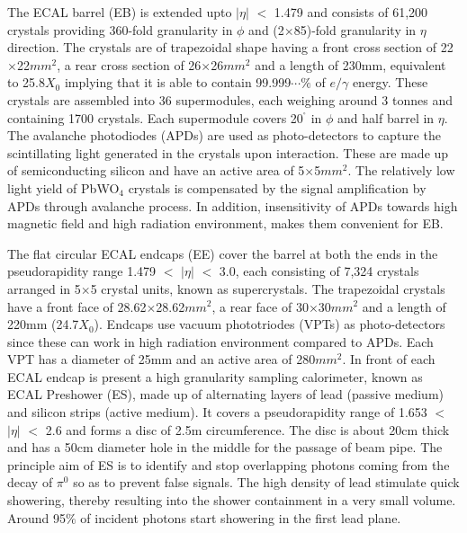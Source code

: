 The ECAL barrel (EB) is extended upto $|\eta|$ $<$ 1.479 and consists of 61,200 crystals providing 360-fold granularity in $\phi$ and (2$\times$85)-fold
granularity in $\eta$ direction. The crystals are of trapezoidal shape having a front cross section of 22$\times$22$\unit{mm}^{2}$,
a rear cross section of 26$\times$26$\unit{mm}^{2}$ and
a length of 230\unit{mm}, equivalent to 25.8$X_{0}$ implying that it is able to contain 99.999$\cdots\%$ of $e/\gamma$ energy. These crystals are assembled
into 36 supermodules, each weighing around 3 tonnes and containing 1700 crystals. Each supermodule covers 20$^{^{\circ}}$ in $\phi$ and half barrel in $\eta$.
The avalanche photodiodes (APDs) are used as photo-detectors to capture the scintillating light generated in the crystals upon interaction. These are made up of
semiconducting silicon and have an active area of 5$\times$5$\unit{mm}^{2}$. The relatively low light yield of PbWO$_{4}$ crystals is compensated by the
signal amplification by APDs through avalanche process. In addition, insensitivity of APDs towards high magnetic field and high radiation environment, makes them
convenient for EB. 

The flat circular ECAL endcaps (EE) cover the barrel at both the ends in the pseudorapidity range 1.479 $<$ $|\eta|$ $<$ 3.0, each consisting of 7,324 crystals arranged
in 5$\times$5 crystal units, known as supercrystals. The trapezoidal crystals have a front face of
28.62$\times$28.62$\unit{mm}^{2}$, a rear face of 30$\times$30$\unit{mm}^{2}$
and a length of 220\unit{mm} (24.7$X_{0}$). Endcaps use vacuum phototriodes (VPTs) as photo-detectors since these can work in high radiation environment compared to
APDs. Each VPT has a diameter of 25\unit{mm} and an active area of 280$\unit{mm}^{2}$. In front of each ECAL endcap is present a high granularity sampling calorimeter,
known as ECAL Preshower (ES), made up of alternating layers of lead (passive medium) and silicon strips (active medium). It covers a pseudorapidity range of
1.653 $<$ $|\eta|$ $<$ 2.6 and forms a disc of 2.5\unit{m} circumference. The disc is about 20\unit{cm} thick and has a 50\unit{cm} diameter hole in the middle
for the passage of beam pipe. The principle aim of ES is to identify and stop overlapping photons coming from the decay of $\pi^{0}$ so as to prevent
false signals. The high density of lead stimulate quick showering, thereby resulting into the shower containment in
a very small volume. Around 95$\%$ of incident photons start showering in the first lead plane. 

